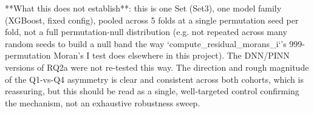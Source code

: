 **What this does not establish**: this is one Set (Set3), one model family (XGBoost, fixed
config), pooled across 5 folds at a single permutation seed per fold, not a full permutation-null
distribution (e.g. not repeated across many random seeds to build a null band the way
`compute_residual_morans_i`'s 999-permutation Moran's I test does elsewhere in this project). The
DNN/PINN versions of RQ2a were not re-tested this way. The direction and rough magnitude of the
Q1-vs-Q4 asymmetry is clear and consistent across both cohorts, which is reassuring, but this
should be read as a single, well-targeted control confirming the mechanism, not an exhaustive
robustness sweep.

